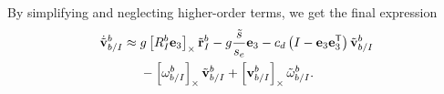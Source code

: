 By simplifying and neglecting higher-order terms, we get the final expression
\begin{equation}
  \begin{split}
  \dot{\tilde{\mathrm{\mathbf{v}}}}_{b/I}^{b} \approx {}& g
  \left[ R_I^b \mathrm{\mathbf{e}}_3 \right]_{\times} \tilde{\mathrm{\mathbf{r}}}_I^b
    -g\frac{\tilde{s}}{s_e}\mathrm{\mathbf{e}}_3
   -c_d \left( I - \mathrm{\mathbf{e}}_3 \mathrm{\mathbf{e}}_3^{\mathsf{T}} \right)
    \tilde{\mathrm{\mathbf{v}}}_{b/I}^b \\
    &- \left[ \mathrm{\mathbf{\omega}}_{b/I}^b \right]_{\times} \tilde{\mathrm{\mathbf{v}}}_{b/I}^b +
    \left[ \mathrm{\mathbf{v}}_{b/I}^b \right]_{\times} \tilde{\mathrm{\mathbf{\omega}}}_{b/I}^b.
  \end{split}
\end{equation}

